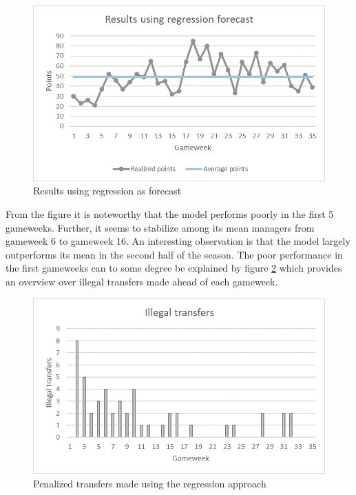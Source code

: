 \begin{figure}[H]
    \centering
    \includegraphics[scale=0.75]{fig/chapter_7/Regression_results.png}
    \caption{Results using regression as forecast}
\label{Regression_results}    
\end{figure}

From the figure it is noteworthy that the model performs poorly in the first 5 gameweeks. Further, it seems to stabilize among its mean managers from gameweek 6 to gameweek 16. An interesting observation is that the model largely outperforms its mean in the second half of the season. The poor performance in the first gameweeks can to some degree be explained by figure \ref{Transfers_regression} which provides an overview over illegal transfers made ahead of each gameweek.

\begin{figure}[H]
    \centering
    \includegraphics[scale=0.75]{fig/chapter_7/Transfers_regression.png}
    \caption{Penalized transfers made using the regression approach}
\label{Transfers_regression}    
\end{figure}

